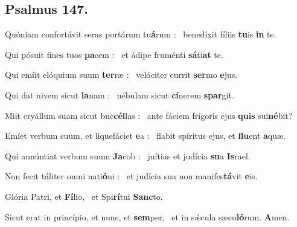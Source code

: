 \documentclass[12pt]{article} %
\newenvironment{psalmtext}{\leftskip 0.25in}{\vspace{1 mm}}
\let\oldgresixstar\gresixstar
\renewcommand{\gresixstar}{\textcolor{benred8}{\oldgresixstar}}
\let\oldAbar\Abar
\renewcommand{\Abar}{\textcolor{benred8}{\oldAbar .}}
\begin{document}
\vspace{2 mm}


\subsection*{}


\gresetfirstlineaboveinitial{\small \textsc{ \textbf{\textcolor{benred8}{5 \Abar\ E}}}}{\small \textsc{ \textbf{\textcolor{benred8}{5 \Abar\ E}}}}

\subsection*{Psalmus 147.}

\begin{psalmtext}
Quóniam confortávit seras portárum tu\textbf{á}rum : \gresixstar\ benedíxit fíliis \textbf{tu}is \textbf{in} te.

Qui pósuit fines tuos \textbf{pa}cem : \gresixstar\ et ádipe fruménti \textbf{sá}ti\textbf{at} te.

Qui emíit elóquium suum \textbf{ter}ræ : \gresixstar\ velóciter currit \textbf{ser}mo \textbf{e}jus.

Qui dat nivem sicut \textbf{la}nam : \gresixstar\ nébulam sicut \textbf{cí}nerem \textbf{spar}git.

Miit cryállum suam sicut buc\textbf{cél}las : \gresixstar\ ante fáciem frígoris ejus \textbf{quis} sui\textbf{né}bit?

Emíet verbum suum, et liquefáciet \textbf{e}a : \gresixstar\ flabit spíritus ejus, et \textbf{flu}ent \textbf{a}quæ.

Qui annúntiat verbum suum \textbf{Ja}cob : \gresixstar\ juítias et judícia \textbf{su}a \textbf{Is}rael.

Non fecit táliter omni nati\textbf{ó}ni : \gresixstar\ et judícia sua non manifes\textbf{tá}vit \textbf{e}is.

Glória Patri, et \textbf{Fí}lio, \gresixstar\ et Spi\textbf{rí}tui \textbf{Sanc}to.

Sicut erat in princípio, et nunc, et \textbf{sem}per, \gresixstar\ et in sǽcula sæcu\textbf{ló}rum. \textbf{A}men.

\end{psalmtext}
\end{document}
